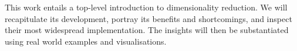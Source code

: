 
\begin{sciabstract}
This work entails a top-level introduction to dimensionality reduction.
We will recapitulate its development, portray its benefits and shortcomings, and inspect their most widespread implementation.
The insights will then be substantiated using real world examples and visualisations.
\end{sciabstract}

\clearpage
